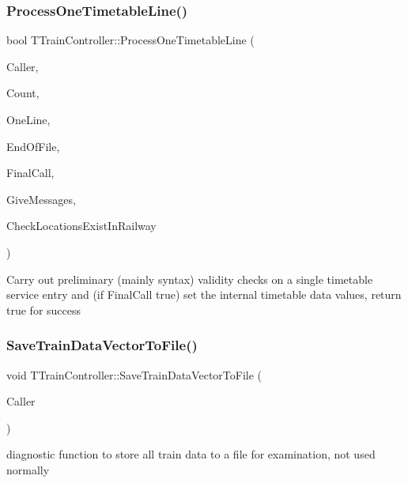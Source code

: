 \subsubsection{\texorpdfstring{Process\+One\+Timetable\+Line()}{ProcessOneTimetableLine()}}
{\footnotesize\ttfamily bool T\+Train\+Controller\+::\+Process\+One\+Timetable\+Line (\begin{DoxyParamCaption}\item[{int}]{Caller,  }\item[{int}]{Count,  }\item[{Ansi\+String}]{One\+Line,  }\item[{bool \&}]{End\+Of\+File,  }\item[{bool}]{Final\+Call,  }\item[{bool}]{Give\+Messages,  }\item[{bool}]{Check\+Locations\+Exist\+In\+Railway }\end{DoxyParamCaption})}

Carry out preliminary (mainly syntax) validity checks on a single timetable service entry and (if Final\+Call true) set the internal timetable data values, return true for success \mbox{\label{class_t_train_controller_a6161618bda2a677f797eda9a9deeb9fa}} 
\subsubsection{\texorpdfstring{Save\+Train\+Data\+Vector\+To\+File()}{SaveTrainDataVectorToFile()}}
{\footnotesize\ttfamily void T\+Train\+Controller\+::\+Save\+Train\+Data\+Vector\+To\+File (\begin{DoxyParamCaption}\item[{int}]{Caller }\end{DoxyParamCaption})}

diagnostic function to store all train data to a file for examination, not used normally \mbox{\label{class_t_train_controller_ac47f05f3d0baaf235c430b631c6fd1ad}} 
